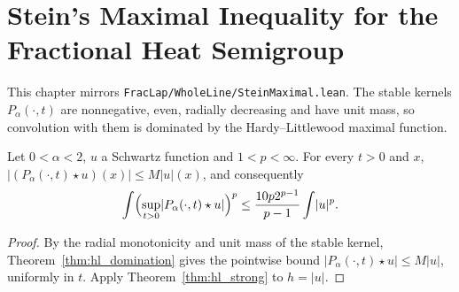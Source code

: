 \chapter{Stein's Maximal Inequality for the Fractional Heat Semigroup}

This chapter mirrors \texttt{FracLap/WholeLine/SteinMaximal.lean}. The stable kernels $P_\alpha(\cdot, t)$ are nonnegative, even, radially decreasing and have unit mass, so convolution with them is dominated by the Hardy--Littlewood maximal function.

\begin{theorem}\label{thm:stein_maximal}
\leanok
Let $0 < \alpha < 2$, $u$ a Schwartz function and $1 < p < \infty$. For every $t > 0$ and $x$, $\lvert (P_\alpha(\cdot, t) \star u)(x)\rvert \le M\lvert u\rvert(x)$, and consequently
\[
  \int \Bigl(\sup_{t > 0} \lvert P_\alpha(\cdot, t) \star u\rvert\Bigr)^p \le \frac{10 p 2^{p-1}}{p-1} \int \lvert u\rvert^p .
\]
\end{theorem}

\begin{proof}
\leanok
By the radial monotonicity and unit mass of the stable kernel, Theorem~\ref{thm:hl_domination} gives the pointwise bound $\lvert P_\alpha(\cdot, t) \star u \rvert \le M \lvert u \rvert$, uniformly in $t$. Apply Theorem~\ref{thm:hl_strong} to $h = \lvert u\rvert$.
\end{proof}
